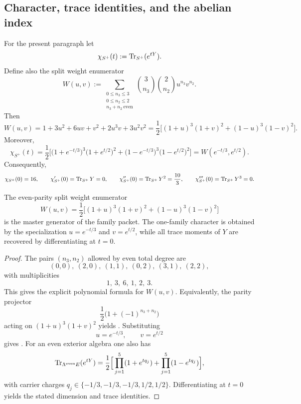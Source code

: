 \subsection{Character, trace identities, and the abelian index}

\begin{proposition}
\label{prop:split-weight-enumerator}
For the present paragraph let
\[
\chi_{S^+}(t):=\operatorname{Tr}_{S^+}(e^{tY}).
\]
Define also the split weight enumerator
\[
W(u,v)
:=
\sum_{\substack{0\le n_3\le 3\\ 0\le n_2\le 2\\ n_3+n_2\ \mathrm{even}}}
\binom{3}{n_3}\binom{2}{n_2}u^{n_3}v^{n_2}.
\]
Then
\begin{equation}
\label{eq:split-weight-enumerator}
W(u,v)
=
1+3u^2+6uv+v^2+2u^3v+3u^2v^2
=
\frac12\Big[(1+u)^3(1+v)^2+(1-u)^3(1-v)^2\Big].
\end{equation}
Moreover,
\begin{equation}
\label{eq:family-character}
\chi_{S^+}(t)
=
\frac12\Big[
\bigl(1+e^{-t/3}\bigr)^3\bigl(1+e^{t/2}\bigr)^2
+
\bigl(1-e^{-t/3}\bigr)^3\bigl(1-e^{t/2}\bigr)^2
\Big]
=
W(e^{-t/3},e^{t/2}).
\end{equation}
Consequently,
\[
\chi_{S^+}(0)=16,
\qquad
\chi_{S^+}'(0)=\operatorname{Tr}_{S^+}Y=0,
\qquad
\chi_{S^+}''(0)=\operatorname{Tr}_{S^+}Y^2=\frac{10}{3},
\qquad
\chi_{S^+}'''(0)=\operatorname{Tr}_{S^+}Y^3=0.
\]
\end{proposition}

\begin{remark}
The even-parity split weight enumerator
\[
W(u,v)=\frac12\bigl[(1+u)^3(1+v)^2+(1-u)^3(1-v)^2\bigr]
\]
is the master generator of the family packet. The one-family character is obtained by the
specialization $u=e^{-t/3}$ and $v=e^{t/2}$, while all trace moments of $Y$ are recovered by
differentiating at $t=0$.
\end{remark}

\begin{proof}
The pairs $(n_3,n_2)$ allowed by even total degree are
\[
(0,0),\ (2,0),\ (1,1),\ (0,2),\ (3,1),\ (2,2),
\]
with multiplicities
\[
1,\ 3,\ 6,\ 1,\ 2,\ 3.
\]
This gives the explicit polynomial formula for $W(u,v)$. Equivalently, the parity projector
\[
\frac12\bigl(1+(-1)^{n_3+n_2}\bigr)
\]
acting on $(1+u)^3(1+v)^2$ yields . Substituting
\[
u=e^{-t/3},
\qquad
v=e^{t/2}
\]
gives . For an even exterior algebra one also has
\[
\operatorname{Tr}_{\Lambda^{\mathrm{even}}E}(e^{tY})
=
\frac12\Big[\prod_{j=1}^5(1+e^{tq_j})+\prod_{j=1}^5(1-e^{tq_j})\Big],
\]
with carrier charges $q_j\in\{-1/3,-1/3,-1/3,1/2,1/2\}$. Differentiating at $t=0$ yields the stated dimension and trace identities.
\end{proof}

